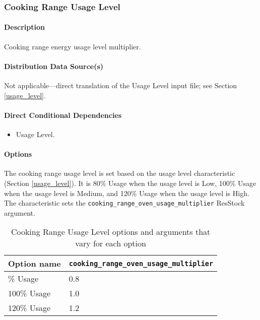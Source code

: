 \subsubsection{Cooking Range Usage Level}\label{cooking_range_usage_level}
\paragraph{Description}
Cooking range energy usage level multiplier.

\paragraph{Distribution Data Source(s)}
Not applicable---direct translation of the Usage Level input file; see Section \ref{usage_level}.
\paragraph{Direct Conditional Dependencies}
\begin{itemize}
    \item Usage Level.
\end{itemize}

\paragraph{Options}
The cooking range usage level is set based on the usage level characteristic (Section \ref{usage_level}). It is 80\% Usage when the usage level is Low, 100\% Usage when the usage level is Medium, and 120\% Usage when the usage level is High. The characteristic sets the \texttt{cooking\_range\_oven\_usage\_multiplier} ResStock argument.
\begin{longtable}[]{ |p{3cm}|p{8cm}| }
\caption{Cooking Range Usage Level options and arguments that vary for each option} \label{table:hc_opt_cooking} \\
\toprule\noalign{}
Option name & 
\texttt{cooking\_range\_oven\_usage\_multiplier} \\
\midrule\noalign{}
\endhead
\bottomrule\noalign{}
\endlastfoot
80\% Usage & 0.8 \\
100\% Usage & 1.0 \\
120\% Usage & 1.2 \\
\end{longtable}

